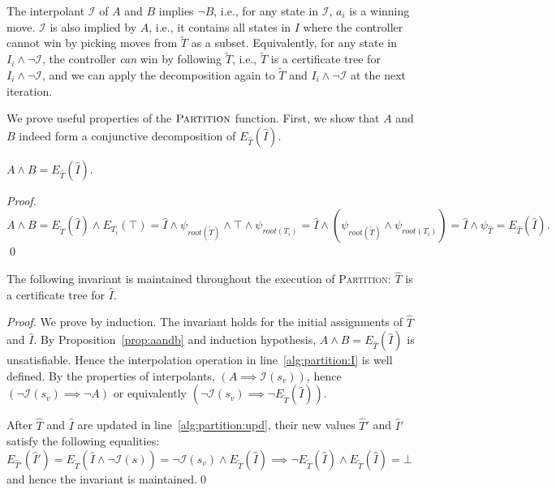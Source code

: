 The interpolant $\mathcal{I}$ of $A$ and $B$
implies $\neg B$, i.e., for any state in $\mathcal{I}$, $a_i$ is a winning move.
$\mathcal{I}$ is also implied by $A$, i.e., it contains all states in $I$ where
the controller cannot win by picking moves from $\tilde{T}$ as a subset.
Equivalently, for any state in $I_i \land \neg \mathcal{I}$, the controller \emph{can}
win by following $\tilde{T}$, i.e., $\tilde{T}$ is a certificate tree for
$I_i \land \neg \mathcal{I}$, and we can apply the decomposition
again to $\tilde{T}$ and $I_i \land \neg \mathcal{I}$
at the next iteration.

We prove useful properties of the $\textsc{Partition}$ function.  First, we show that $A$ and
$B$ indeed form a conjunctive decomposition of $E_{\hat{T}}(\hat{I})$.
\begin{proposition}\label{prop:aandb}
    $A\land B = E_{\hat{T}}(\hat{I})$.
\end{proposition}
\begin{proof}
$A\land B = E_{\tilde{T}}(\hat{I}) \land E_{T_i}(\top) =
\hat{I} \land \psi_{root(\tilde{T})} \land \top \land \psi_{root(T_i)} =
\hat{I} \land (\psi_{root(\tilde{T})}\! \land\! \psi_{root(T_i)}) =
\hat{I}\! \land\! \psi_{\hat{T}} = E_{\hat{T}}(\hat{I}).$
\qed
\end{proof}

\begin{proposition}
    The following invariant is maintained throughout the execution of
    \textsc{Partition}: $\hat{T}$ is a certificate tree for $\hat{I}$.
\end{proposition}
\begin{proof}
We prove by induction.  The invariant holds for the initial
assignments of $\hat{T}$ and $\hat{I}$.
By Proposition~\ref{prop:aandb} and induction hypothesis, $A\land B =
E_{\hat{T}}(\hat{I})$ is unsatisfiable.  Hence the interpolation
operation in line~\ref{alg:partition:I} is well defined.  By the
properties of interpolants, $(A\implies\mathcal{I}(s_v))$, hence
$(\neg\mathcal{I}(s_v) \implies \neg A)$ or equivalently
$(\neg\mathcal{I}(s_v) \implies \neg E_{\tilde{T}}(\hat{I}))$.

After $\hat{T}$ and $\hat{I}$ are updated in
line~\ref{alg:partition:upd}, their new values $\hat{T}'$ and
$\hat{I}'$ satisfy the following equalities:
$E_{\hat{T}'}(\hat{I}') = E_{\tilde{T}}(\hat{I} \land
\neg\mathcal{I}(s)) = \neg\mathcal{I}(s_v) \land
E_{\tilde{T}}(\hat{I}) \implies \neg E_{\tilde{T}}(\hat{I}) \land
E_{\tilde{T}}(\hat{I}) = \bot$ and hence the invariant is
maintained.\qed
\end{proof}

